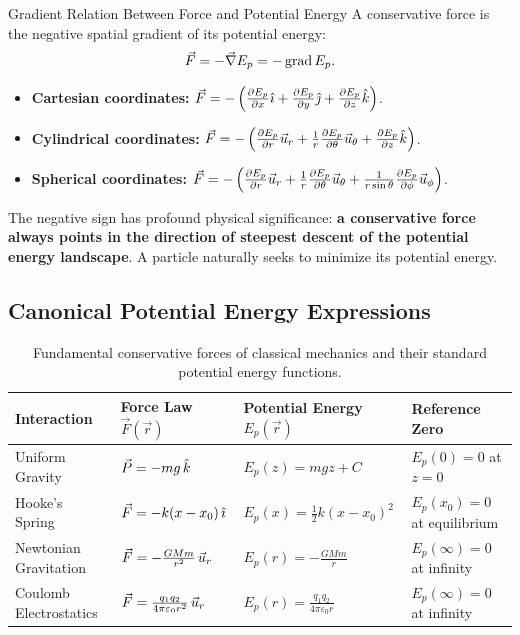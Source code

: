 \begin{lawbox}{Gradient Relation Between Force and Potential Energy}
A conservative force is the negative spatial gradient of its potential energy:
\begin{equation}
\vec{F} = -\vec{\nabla} E_p = -\operatorname{grad} E_p.
\end{equation}
\begin{itemize}[leftmargin=1.5em,itemsep=3pt]
  \item \textbf{Cartesian coordinates:} $\vec{F} = -\left( \frac{\partial E_p}{\partial x}\hat{\imath} + \frac{\partial E_p}{\partial y}\hat{\jmath} + \frac{\partial E_p}{\partial z}\hat{k} \right)$.
  \item \textbf{Cylindrical coordinates:} $\vec{F} = -\left( \frac{\partial E_p}{\partial r}\vec{u}_r + \frac{1}{r}\frac{\partial E_p}{\partial \theta}\vec{u}_\theta + \frac{\partial E_p}{\partial z}\hat{k} \right)$.
  \item \textbf{Spherical coordinates:} $\vec{F} = -\left( \frac{\partial E_p}{\partial r}\vec{u}_r + \frac{1}{r}\frac{\partial E_p}{\partial \theta}\vec{u}_\theta + \frac{1}{r\sin\theta}\frac{\partial E_p}{\partial \phi}\vec{u}_\phi \right)$.
\end{itemize}
\end{lawbox}

The negative sign has profound physical significance: \textbf{a conservative force always points in the direction of steepest descent of the potential energy landscape}. A particle naturally seeks to minimize its potential energy.

\subsection{Canonical Potential Energy Expressions}

\begin{table}[htbp]
\centering
\renewcommand{\arraystretch}{1.35}
\begin{tabular}{@{}llll@{}}
\toprule
\textbf{Interaction} & \textbf{Force Law $\vec{F}(\vec{r})$} & \textbf{Potential Energy $E_p(\vec{r})$} & \textbf{Reference Zero} \\
\midrule
Uniform Gravity & $\vec{P} = -mg\,\hat{k}$ & $E_p(z) = mgz + C$ & $E_p(0) = 0$ at $z = 0$ \\
Hooke's Spring & $\vec{F} = -k(x - x_0)\,\hat{\imath}$ & $E_p(x) = \frac{1}{2}k(x - x_0)^2$ & $E_p(x_0) = 0$ at equilibrium \\
Newtonian Gravitation & $\vec{F} = -\frac{G M m}{r^2}\,\vec{u}_r$ & $E_p(r) = -\frac{G M m}{r}$ & $E_p(\infty) = 0$ at infinity \\
Coulomb Electrostatics & $\vec{F} = \frac{q_1 q_2}{4\pi\varepsilon_0 r^2}\,\vec{u}_r$ & $E_p(r) = \frac{q_1 q_2}{4\pi\varepsilon_0 r}$ & $E_p(\infty) = 0$ at infinity \\
\bottomrule
\end{tabular}
\caption{Fundamental conservative forces of classical mechanics and their standard potential energy functions.}
\label{tab:potentials}
\end{table}

